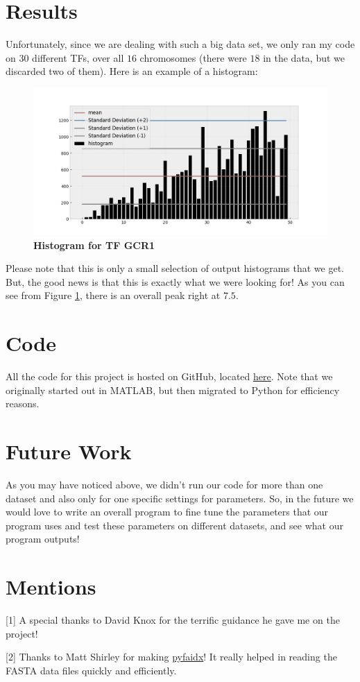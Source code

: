 \documentclass{article}
\begin{document}
\section{Results}
Unfortunately, since we are dealing with such a big data set, we only ran my code on $30$ different TFs, over all $16$ chromosomes (there were $18$ in the data, but we discarded two of them). Here is an example of a histogram:
\begin{figure}[H]
  \centering
  \includegraphics[scale=0.29]{HistGCR1.png}
  \caption{\textbf{Histogram for TF GCR1}}
  \label{fig:histGCR1}
\end{figure}
Please note that this is only a small selection of output histograms that we get. But, the good news is that this is exactly what we were looking for! As you can see from Figure \ref{fig:histGCR1}, there is an overall peak right at $7.5$.
\section{Code}
All the code for this project is hosted on GitHub, located \href{https://github.com/johnletey/PoBT}{here}. Note that we originally started out in MATLAB, but then migrated to Python for efficiency reasons.

\section{Future Work}

As you may have noticed above, we didn't run our code for more than one dataset and also only for one specific settings for parameters. So, in the future we would love to write an overall program to fine tune the parameters that our program uses and test these parameters on different datasets, and see what our program outputs!

\section{Mentions}
\small

\footnotesize{[1] A special thanks to David Knox for the terrific guidance he gave me on the project!}

\footnotesize{[2] Thanks to Matt Shirley for making \href{https://github.com/mdshw5/pyfaidx}{pyfaidx}! It really helped in reading the FASTA data files quickly and efficiently.}
\end{document}
